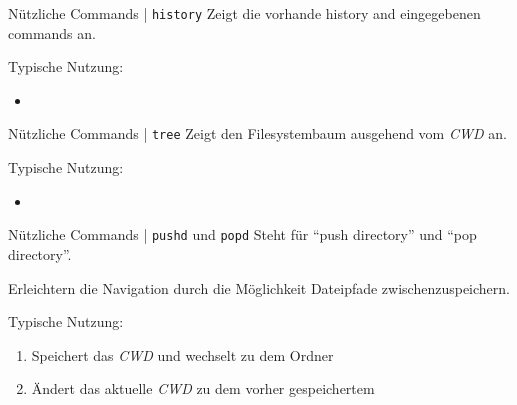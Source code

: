 \documentclass{setbeamer}
\begin{document}
\begin{frame}{Nützliche Commands | \texttt{history}}
    Zeigt die vorhande history and eingegebenen commands an.

    \vspace{0.3cm}

    Typische Nutzung:
    \begin{itemize}
        \item {}
    \end{itemize}
\end{frame}

\begin{frame}{Nützliche Commands | \texttt{tree}}
    Zeigt den Filesystembaum ausgehend vom \emph{CWD} an.

    \vspace{0.3cm}

    Typische Nutzung:
    \begin{itemize}
        \item {}
    \end{itemize}
\end{frame}

\begin{frame}{Nützliche Commands | \texttt{pushd} und \texttt{popd}}
    Steht für ``push directory'' und ``pop directory''.

    \vspace{0.3cm}

    Erleichtern die Navigation durch die Möglichkeit Dateipfade zwischenzuspeichern.

    \vspace{0.3cm}

    Typische Nutzung:
    \begin{enumerate}
        \item {}\textemdash Speichert das \emph{CWD} und wechselt zu dem Ordner 
        \item {}\textemdash Ändert das aktuelle \emph{CWD} zu dem vorher gespeichertem
    \end{enumerate}
\end{frame}
\end{document}
